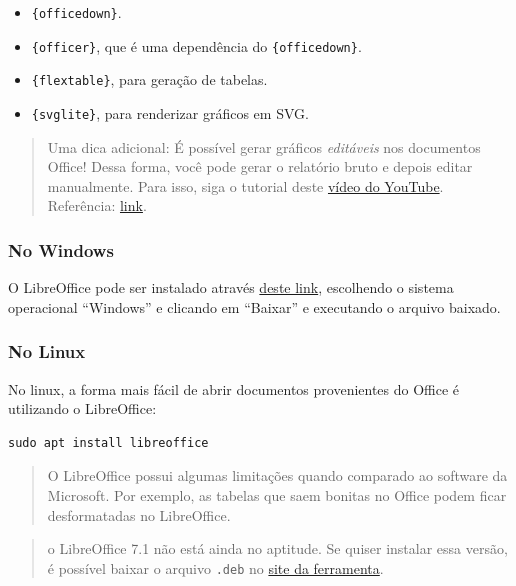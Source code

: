 \documentclass[
]{book}
\providecommand{\tightlist}{%
  \setlength{\itemsep}{0pt}\setlength{\parskip}{0pt}}
\begin{document}
\begin{itemize}
\tightlist
\item
  \texttt{\{officedown\}}.
\item
  \texttt{\{officer\}}, que é uma dependência do \texttt{\{officedown\}}.
\item
  \texttt{\{flextable\}}, para geração de tabelas.
\item
  \texttt{\{svglite\}}, para renderizar gráficos em SVG.
\end{itemize}

\begin{quote}
Uma dica adicional: É possível gerar gráficos \emph{editáveis} nos documentos Office! Dessa forma, você pode gerar o relatório bruto e depois editar manualmente. Para isso, siga o tutorial deste \href{https://www.youtube.com/watch?v=Yprmq8AUf8g}{vídeo do YouTube}. Referência: \href{http://www.sthda.com/english/wiki/saving-high-resolution-ggplots-how-to-preserve-semi-transparency}{link}.
\end{quote}

\hypertarget{no-windows-2}{%
\subsubsection{No Windows}\label{no-windows-2}}

O LibreOffice pode ser instalado através \href{https://pt-br.libreoffice.org/baixe-ja/libreoffice-novo/}{deste link}, escolhendo o sistema operacional ``Windows'' e clicando em ``Baixar'' e executando o arquivo baixado.

\hypertarget{no-linux-2}{%
\subsubsection{No Linux}\label{no-linux-2}}

No linux, a forma mais fácil de abrir documentos provenientes do Office é utilizando o LibreOffice:

\begin{verbatim}
sudo apt install libreoffice
\end{verbatim}

\begin{quote}
O LibreOffice possui algumas limitações quando comparado ao software da Microsoft. Por exemplo, as tabelas que saem bonitas no Office podem ficar desformatadas no LibreOffice.
\end{quote}

\begin{quote}
o LibreOffice 7.1 não está ainda no aptitude. Se quiser instalar essa versão, é possível baixar o arquivo \texttt{.deb} no \href{https://www.libreoffice.org}{site da ferramenta}.
\end{quote}
\end{document}
